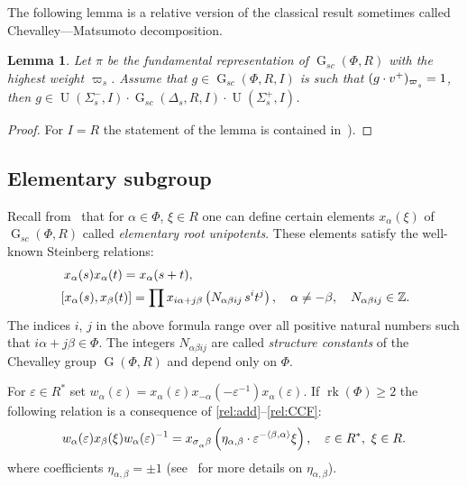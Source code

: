 \documentclass[12pt]{amsart}
\numberwithin{equation}{section}
\newtheorem{lemma}[lemmacounter]{Lemma}
\theoremstyle{definition}
\DeclareMathOperator{\G}{G}
\DeclareMathOperator{\U}{U}
\DeclareMathOperator{\rk}{rk}
\def\ssub#1{\mathchoice
   {_{\lower2pt\hbox{$\scriptstyle #1$}}}
   {_{\lower2pt\hbox{$\scriptstyle #1$}}}
   {_{\lower1.5pt\hbox{$\scriptscriptstyle #1$}}}
   {_{\!\lower1.5pt\hbox{$\scriptscriptstyle #1$}}}}
\begin{document}
The following lemma is a relative version of the classical result sometimes called Chevalley---Matsumoto decomposition.
\begin{lemma}\label{lemma:Chevalley-Matsumoto}
Let $\pi$ be the fundamental representation of $\G_{sc}(\Phi, R)$ with the highest weight $\varpi_s$.
Assume that $g\in \G_{sc}(\Phi, R, I)$ is such that $(g\cdot v^+)_{\varpi\ssub{s}}=1$, then 
$g \in \U(\Sigma_s^-, I) \cdot \G_{sc}(\Delta_s, R, I) \cdot \U(\Sigma_s^+, I)$.
\end{lemma} \begin{proof}  For $I=R$ the statement of the lemma is contained in~\cite[Theorem~1.3]{St78}). \end{proof}

\subsection{Elementary subgroup}\label{sec:elementary}
Recall from~\cite{St78, VP} that for $\alpha\in \Phi$, $\xi\in R$ one can define certain elements $x_{\alpha}(\xi)$ of $\G_{sc}(\Phi, R)$ called {\it elementary root unipotents}.
These elements satisfy the well-known Steinberg relations:
\begin{align}
& \phantom{\left[{}\vphantom{x_\beta(t)}\right.}
x_\alpha(s) x_\alpha(t) = x_\alpha(s+t), \label{rel:add}\\
& \left[x_\alpha(s),  x_\beta(t)\right] = \prod x_{i\alpha + j\beta}\left(N_{\alpha\beta ij}\, s^i t^j\right),\quad \alpha\neq-\beta, \quad N_{\alpha\beta ij}\in\mathbb{Z}. \label{rel:CCF}
\end{align} 
The indices $i$, $j$ in the above formula range over all positive natural numbers such that $i\alpha + j\beta\in\Phi$.
The integers $N_{\alpha\beta ij}$ are called {\it structure constants} of the Chevalley group $\G(\Phi,R)$ and depend only on $\Phi$.

For $\varepsilon\in R^*$ set $w_\alpha(\varepsilon) = x_\alpha(\varepsilon) x_{-\alpha}(-\varepsilon^{-1}) x_{\alpha}(\varepsilon).$
If $\rk(\Phi)\geqslant 2$ the following relation is a consequence of \ref{rel:add}--\ref{rel:CCF}:
\begin{equation}\label{rel:R3}
w_\alpha(\varepsilon) x_{\beta}(\xi) w_\alpha(\varepsilon)^{-1} =
x_{\sigma\ssub{\alpha}\beta} \left(\eta_{\alpha, \beta}\cdot\varepsilon^{-\langle\beta,\alpha \rangle}\xi\right),\quad \varepsilon\in R^*,\ \xi\in R.
\end{equation}
where coefficients $\eta_{\alpha, \beta} = \pm 1$ (see~\cite[\S13]{VP} for more details on $\eta_{\alpha, \beta}$).
\end{document}
